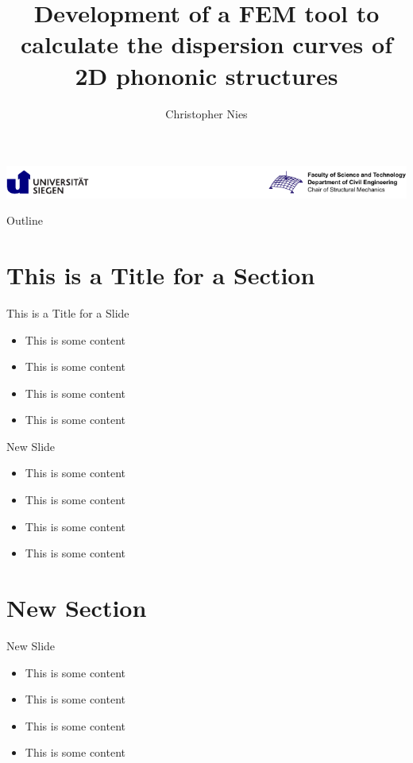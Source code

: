 \documentclass[
]{beamer}
\title[FEM tool to calculate dispersion curves]{
	Development of a FEM tool to calculate the dispersion curves of 2D phononic structures 
}
\author{Christopher Nies}
\institute{Chair of Structural Mechanics}
\begin{document}
\begin{frame}
	\centering\includegraphics[width=\textwidth]{uni-baustatik-logo.pdf}\\
	\titlepage
\end{frame}

\begin{frame}{Outline}
	\tableofcontents
\end{frame}

\section{This is a Title for a Section}

\begin{frame}{This is a Title for a Slide}

	\begin{itemize}
		\item This is some content
		\item This is some content
		\item This is some content
		\item This is some content
	\end{itemize}

\end{frame}

\begin{frame}{New Slide}

\begin{itemize}
	\item This is some content
	\item This is some content
	\item This is some content
	\item This is some content
\end{itemize}

\end{frame}


\section{New Section}

\begin{frame}{New Slide}

\begin{itemize}
	\item This is some content
	\item This is some content
	\item This is some content
	\item This is some content
\end{itemize}

\end{frame}
\end{document}
